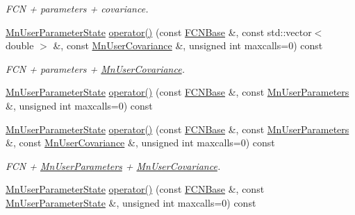 \begin{DoxyCompactItemize}
\begin{DoxyCompactList}\small\item\em F\+CN + parameters + covariance. \end{DoxyCompactList}\item 
\mbox{\hyperlink{classROOT_1_1Minuit2_1_1MnUserParameterState}{Mn\+User\+Parameter\+State}} \mbox{\hyperlink{classROOT_1_1Minuit2_1_1MnHesse_a5d575c4f72e0024578b07579a7e3a4a3}{operator()}} (const \mbox{\hyperlink{classROOT_1_1Minuit2_1_1FCNBase}{F\+C\+N\+Base}} \&, const std\+::vector$<$ double $>$ \&, const \mbox{\hyperlink{classROOT_1_1Minuit2_1_1MnUserCovariance}{Mn\+User\+Covariance}} \&, unsigned int maxcalls=0) const
\begin{DoxyCompactList}\small\item\em F\+CN + parameters + \mbox{\hyperlink{classROOT_1_1Minuit2_1_1MnUserCovariance}{Mn\+User\+Covariance}}. \end{DoxyCompactList}\item 
\mbox{\hyperlink{classROOT_1_1Minuit2_1_1MnUserParameterState}{Mn\+User\+Parameter\+State}} \mbox{\hyperlink{classROOT_1_1Minuit2_1_1MnHesse_ab7a2674f254e7f6056885d7d792ea671}{operator()}} (const \mbox{\hyperlink{classROOT_1_1Minuit2_1_1FCNBase}{F\+C\+N\+Base}} \&, const \mbox{\hyperlink{classROOT_1_1Minuit2_1_1MnUserParameters}{Mn\+User\+Parameters}} \&, unsigned int maxcalls=0) const
\item 
\mbox{\hyperlink{classROOT_1_1Minuit2_1_1MnUserParameterState}{Mn\+User\+Parameter\+State}} \mbox{\hyperlink{classROOT_1_1Minuit2_1_1MnHesse_aeba6a2c85b9bda7785d418a6e2605722}{operator()}} (const \mbox{\hyperlink{classROOT_1_1Minuit2_1_1FCNBase}{F\+C\+N\+Base}} \&, const \mbox{\hyperlink{classROOT_1_1Minuit2_1_1MnUserParameters}{Mn\+User\+Parameters}} \&, const \mbox{\hyperlink{classROOT_1_1Minuit2_1_1MnUserCovariance}{Mn\+User\+Covariance}} \&, unsigned int maxcalls=0) const
\begin{DoxyCompactList}\small\item\em F\+CN + \mbox{\hyperlink{classROOT_1_1Minuit2_1_1MnUserParameters}{Mn\+User\+Parameters}} + \mbox{\hyperlink{classROOT_1_1Minuit2_1_1MnUserCovariance}{Mn\+User\+Covariance}}. \end{DoxyCompactList}\item 
\mbox{\hyperlink{classROOT_1_1Minuit2_1_1MnUserParameterState}{Mn\+User\+Parameter\+State}} \mbox{\hyperlink{classROOT_1_1Minuit2_1_1MnHesse_a4ebea568262a19a0cfec1473ce7a5f0f}{operator()}} (const \mbox{\hyperlink{classROOT_1_1Minuit2_1_1FCNBase}{F\+C\+N\+Base}} \&, const \mbox{\hyperlink{classROOT_1_1Minuit2_1_1MnUserParameterState}{Mn\+User\+Parameter\+State}} \&, unsigned int maxcalls=0) const

\end{DoxyCompactItemize}
